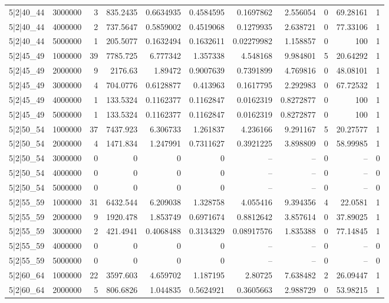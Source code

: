 \begin{tabular}{lrrrrrrrrrr}
5|2|40\_44 & 3000000 & 3 & 835.2435 & 0.6634935 & 0.4584595 & 0.1697862 & 2.556054 & 0 & 69.28161 & 1 \\
5|2|40\_44 & 4000000 & 2 & 737.5647 & 0.5859002 & 0.4519068 & 0.1279935 & 2.638721 & 0 & 77.33106 & 1 \\
5|2|40\_44 & 5000000 & 1 & 205.5077 & 0.1632494 & 0.1632611 & 0.02279982 & 1.158857 & 0 & 100 & 1 \\
5|2|45\_49 & 1000000 & 39 & 7785.725 & 6.777342 & 1.357338 & 4.548168 & 9.984801 & 5 & 20.64292 & 1 \\
5|2|45\_49 & 2000000 & 9 & 2176.63 & 1.89472 & 0.9007639 & 0.7391899 & 4.769816 & 0 & 48.08101 & 1 \\
5|2|45\_49 & 3000000 & 4 & 704.0776 & 0.6128877 & 0.413963 & 0.1617795 & 2.292983 & 0 & 67.72532 & 1 \\
5|2|45\_49 & 4000000 & 1 & 133.5324 & 0.1162377 & 0.1162847 & 0.0162319 & 0.8272877 & 0 & 100 & 1 \\
5|2|45\_49 & 5000000 & 1 & 133.5324 & 0.1162377 & 0.1162847 & 0.0162319 & 0.8272877 & 0 & 100 & 1 \\
5|2|50\_54 & 1000000 & 37 & 7437.923 & 6.306733 & 1.261837 & 4.236166 & 9.291167 & 5 & 20.27577 & 1 \\
5|2|50\_54 & 2000000 & 4 & 1471.834 & 1.247991 & 0.7311627 & 0.3921225 & 3.898809 & 0 & 58.99985 & 1 \\
5|2|50\_54 & 3000000 & 0 & 0 & 0 & 0 & -- & -- & 0 & -- & 0 \\
5|2|50\_54 & 4000000 & 0 & 0 & 0 & 0 & -- & -- & 0 & -- & 0 \\
5|2|50\_54 & 5000000 & 0 & 0 & 0 & 0 & -- & -- & 0 & -- & 0 \\
5|2|55\_59 & 1000000 & 31 & 6432.544 & 6.209038 & 1.328758 & 4.055416 & 9.394356 & 4 & 22.0581 & 1 \\
5|2|55\_59 & 2000000 & 9 & 1920.478 & 1.853749 & 0.6971674 & 0.8812642 & 3.857614 & 0 & 37.89025 & 1 \\
5|2|55\_59 & 3000000 & 2 & 421.4941 & 0.4068488 & 0.3134329 & 0.08917576 & 1.835388 & 0 & 77.14845 & 1 \\
5|2|55\_59 & 4000000 & 0 & 0 & 0 & 0 & -- & -- & 0 & -- & 0 \\
5|2|55\_59 & 5000000 & 0 & 0 & 0 & 0 & -- & -- & 0 & -- & 0 \\
5|2|60\_64 & 1000000 & 22 & 3597.603 & 4.659702 & 1.187195 & 2.80725 & 7.638482 & 2 & 26.09447 & 1 \\
5|2|60\_64 & 2000000 & 5 & 806.6826 & 1.044835 & 0.5624921 & 0.3605663 & 2.988729 & 0 & 53.98215 & 1 \\

\end{tabular}
